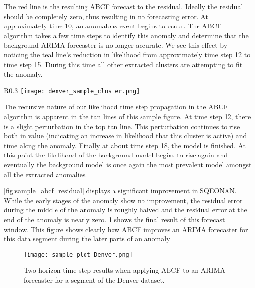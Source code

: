 The red line is the resulting ABCF forecast to the residual.  Ideally the residual should be completely zero, thus resulting in no forecasting error.  At approximately time 10, an anomalous event begins to occur.  The ABCF algorithm takes a few time steps to identify this anomaly and determine that the background ARIMA forecaster is no longer accurate.  We see this effect by noticing the teal line's reduction in likelihood from approximately time step 12 to time step 15.  During this time all other extracted clusters are attempting to fit the anomaly.

\begin{wrapfigure}{R}{0.3\textwidth}
\centering
\texttt{[image: denver\_sample\_cluster.png]}
\caption{Extracted sample clustered anomaly.}
\label{fig:sample_cluster}
\end{wrapfigure}

The recursive nature of our likelihood time step propagation in the ABCF algorithm is apparent in the tan lines of this sample figure.  At time step 12, there is a slight perturbation in the top tan line.  This perturbation continues to rise both in value (indicating an increase in likelihood that this cluster is active) and time along the anomaly.  Finally at about time step 18, the model is finished.  At this point the likelihood of the background model begins to rise again and eventually the background model is once again the most prevalent model amongst all the extracted anomalies.

\ref{fig:sample_abcf_residual} displays a significant improvement in SQEONAN.  While the early stages of the anomaly show no improvement, the residual error during the middle of the anomaly is roughly halved and the residual error at the end of the anomaly is nearly zero.  \ref{fig:sample_abcf_denver} shows the final result of this forecast window.  This figure shows clearly how ABCF improves an ARIMA forecaster for this data segment during the later parts of an anomaly.

\begin{figure}[!h]
	\begin{center}
		\texttt{[image: sample\_plot\_Denver.png]}
	\end{center}
	\caption{Two horizon time step results when applying ABCF to an ARIMA forecaster for a segment of the Denver dataset.}
	\label{fig:sample_abcf_denver}
\end{figure}



